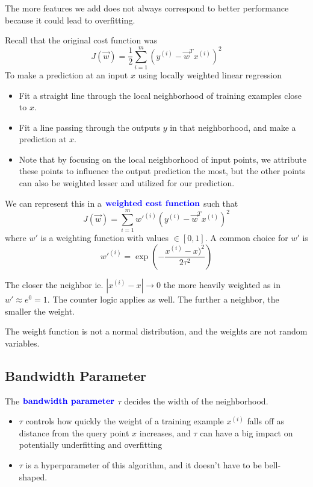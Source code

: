 \documentclass[12pt]{scrartcl}
\begin{document}
\begin{note}
    The more features we add does not always correspond to better performance because it could lead to overfitting.
\end{note}

Recall that the original cost function was
\[J(\vec{w}) = \frac{1}{2}\sum_{i = 1}^m (y^{(i)} - \vec{w}^T x^{(i)})^2\] To make a prediction at an input $x$ using locally weighted linear regression
\begin{itemize}
    \item Fit a straight line through the local neighborhood of training examples close to $x$.
    \item Fit a line passing through the outputs $y$ in that neighborhood, and make a prediction at $x$.
    \item Note that by focusing on the local neighborhood of input points, we attribute these points to influence the output prediction the most, but the other points can also be weighted lesser and utilized for our prediction.
\end{itemize}
\begin{definition}
    We can represent this in a $\textbf{\color{blue} weighted cost function}$ such that 
\[J(\vec{w}) = \sum_{i=1}^m w'^{(i)}(y^{(i)} - \vec{w}^Tx^{(i)})^2\]
where $w'$ is a weighting function with values $\in [0, 1]$. A common choice for $w'$ is 
\[w'^{(i)} = \exp(-\frac{x^{(i)} - x)^2}{2\tau^2})\]
\end{definition}
\begin{note}
    The closer the neighbor ie. $|x^{(i)} - x| \to 0$ the more heavily weighted as in $w' \approx e^0 = 1$. The counter logic applies as well. The further a neighbor, the smaller the weight.
\end{note}
\begin{note}
    The weight function is not a normal distribution, and the weights are not random variables.
\end{note}

\subsection{Bandwidth Parameter}

\begin{definition}
    The $\textbf{\color{blue} bandwidth parameter}$ $\tau$ decides the width of the neighborhood.
\end{definition}

\begin{itemize}
    \item $\tau$ controls how quickly the weight of a training example $x^{(i)}$ falls off as distance from the query point $x$ increases, and $\tau$ can have a big impact on potentially underfitting and overfitting
    \item $\tau$ is a hyperparameter of this algorithm, and it doesn't have to be bell-shaped.
\end{itemize}
\end{document}
